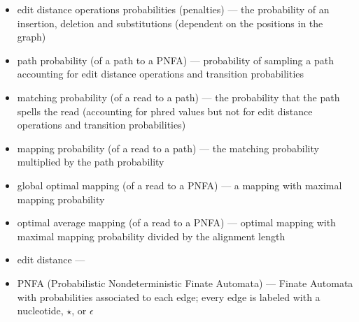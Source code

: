 \begin{itemize}
	\item edit distance operations\textquotesingle{} probabilities (penalties) --- the probability of an insertion, deletion and substitutions (dependent on the positions in the graph)
	\item path probability (of a path to a PNFA) --- probability of sampling a path accounting for edit distance operations and transition probabilities
	\item matching probability (of a read to a path) --- the probability that the path spells the read (accounting for phred values but not for edit distance operations and transition probabilities)
	\item mapping probability (of a read to a path) --- the matching probability multiplied by the path probability
	\item global optimal mapping (of a read to a PNFA) --- a mapping with maximal mapping probability
	\item optimal average mapping (of a read to a PNFA) --- optimal mapping with maximal mapping probability divided by the alignment length
	\item edit distance --- 
	\item PNFA (Probabilistic Nondeterministic Finate Automata) --- Finate Automata with probabilities associated to each edge; every edge is labeled with a nucleotide, $\star$, or $\epsilon$
\end{itemize}
